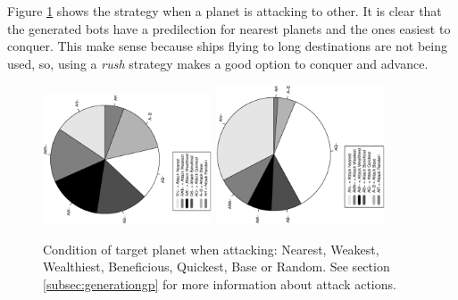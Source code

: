 \documentclass[conference]{IEEEtran}
\begin{document}
Figure \ref{figura:tarta_attacking} shows the strategy when a planet is attacking to other. It is clear that the generated bots have a predilection for nearest planets and the ones easiest to conquer. This make sense because ships flying to long destinations are not being used, so, using a {\em rush} strategy makes a good option to conquer and advance.
\begin{figure}[htb]
\tiny
\begin{center}

    \includegraphics[trim=1cm 7cm 0cm 7cm, clip=true,width=5cm,angle=-90]{./imags/distribution_initial_attack.eps}
    \includegraphics[trim=1cm 7cm 0cm 7cm, clip=true,width=5cm,angle=-90]{./imags/distribution_final_attack.eps}

\end{center}
\caption{Condition of target planet when attacking: Nearest, Weakest, Wealthiest, Beneficious, Quickest, Base or Random. See section \ref{subsec:generationgp} for more information about attack actions.}
\label{figura:tarta_attacking}
\end{figure}
\end{document}

